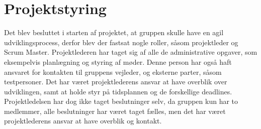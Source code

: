\section{Projektstyring}

Det blev besluttet i starten af projektet, at gruppen skulle have en agil udviklingsprocess, derfor blev der fastsat nogle roller, såsom projektleder og Scrum Master. Projektlederen har taget sig af alle de administrative opgaver, som eksempelvis planlægning og styring af møder. Denne person har også haft ansvaret for kontakten til gruppens vejleder, og eksterne parter, såsom testpersoner. Det har været projektlederens ansvar at have overblik over udviklingen, samt at holde styr på tidsplannen og de forskellige deadlines. Projektledelsen har dog ikke taget beslutninger selv, da gruppen kun har to medlemmer, alle beslutninger har været taget fælles, men det har været projektlederens ansvar at have overblik og kontakt.